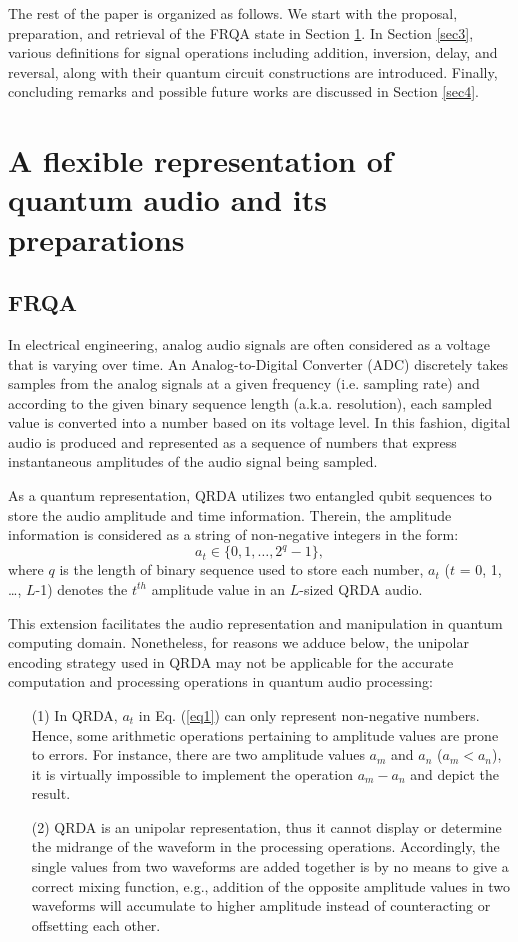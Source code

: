 \documentclass[10pt,journal,compsoc]{IEEEtran}
\begin{document}
The rest of the paper is organized as follows. We start with the proposal, preparation, and retrieval of the FRQA state in Section \ref{sec2}. In Section \ref{sec3}, various definitions for signal operations including addition, inversion, delay, and reversal, along with their quantum circuit constructions are introduced. Finally, concluding remarks and possible future works are discussed in Section \ref{sec4}.

\section{A flexible representation of quantum audio and its preparations}\label{sec2}
\subsection{FRQA}\label{sec2-1}
In electrical engineering, analog audio signals are often considered as a voltage that is varying over time. An Analog-to-Digital Converter (ADC) discretely takes samples from the analog signals at a given frequency (i.e. sampling rate) and according to the given binary sequence length (a.k.a. resolution), each sampled value is converted into a number based on its voltage level. In this fashion, digital audio is produced and represented as a sequence of numbers that express instantaneous amplitudes of the audio signal being sampled.

As a quantum representation, QRDA utilizes two entangled qubit sequences to store the audio amplitude and time information. Therein, the amplitude information is considered as a string of non-negative integers in the form:
\begin{equation}\label{eq1}
a_t \in \{0, 1, \ldots, 2^q-1\},
\end{equation}
where $q$ is the length of binary sequence used to store each number, $a_t$ ($t$ = 0, 1, \ldots, $L$-1) denotes the $t^{th}$ amplitude value in an $L$-sized QRDA audio.

This extension facilitates the audio representation and manipulation in quantum computing domain. Nonetheless, for reasons we adduce below, the unipolar encoding strategy used in QRDA may not be applicable for the accurate computation and processing operations in quantum audio processing:
\begin{itemize}
  \item[(1)] In QRDA, $a_t$ in Eq. (\ref{eq1}) can only represent non-negative numbers. Hence, some arithmetic operations pertaining to amplitude values are prone to errors. For instance, there are two amplitude values $a_m$ and $a_n$ ($a_m < a_n$), it is virtually impossible to implement the operation $a_m - a_n$ and depict the result.
  \item[(2)] QRDA is an unipolar representation, thus it cannot display or determine the midrange of the waveform in the processing operations. Accordingly, the single values from two waveforms are added together is by no means to give a correct mixing function, e.g., addition of the opposite amplitude values in two waveforms will accumulate to higher amplitude instead of counteracting or offsetting each other.
\end{itemize}
\end{document}
